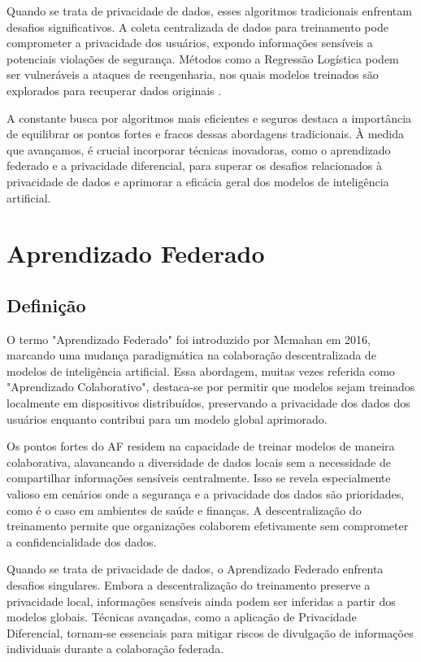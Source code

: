 Quando se trata de privacidade de dados, esses algoritmos tradicionais enfrentam desafios significativos. A coleta centralizada de dados para treinamento pode comprometer a privacidade dos usuários, expondo informações sensíveis a potenciais violações de segurança. Métodos como a Regressão Logística podem ser vulneráveis a ataques de reengenharia, nos quais modelos treinados são explorados para recuperar dados originais \cite{fredrikson2014privacy}.

A constante busca por algoritmos mais eficientes e seguros destaca a importância de equilibrar os pontos fortes e fracos dessas abordagens tradicionais. À medida que avançamos, é crucial incorporar técnicas inovadoras, como o aprendizado federado e a privacidade diferencial, para superar os desafios relacionados à privacidade de dados e aprimorar a eficácia geral dos modelos de inteligência artificial.

\section{Aprendizado Federado}
\label{sec:federado}

\subsection{Definição}

O termo "Aprendizado Federado" foi introduzido por Mcmahan em 2016, marcando uma mudança paradigmática na colaboração descentralizada de modelos de inteligência artificial\cite{mcmahan2017communication}. Essa abordagem, muitas vezes referida como "Aprendizado Colaborativo", destaca-se por permitir que modelos sejam treinados localmente em dispositivos distribuídos, preservando a privacidade dos dados dos usuários enquanto contribui para um modelo global aprimorado.

Os pontos fortes do AF residem na capacidade de treinar modelos de maneira colaborativa, alavancando a diversidade de dados locais sem a necessidade de compartilhar informações sensíveis centralmente. Isso se revela especialmente valioso em cenários onde a segurança e a privacidade dos dados são prioridades, como é o caso em ambientes de saúde e finanças. A descentralização do treinamento permite que organizações colaborem efetivamente sem comprometer a confidencialidade dos dados\cite{yang2019federated}.

Quando se trata de privacidade de dados, o Aprendizado Federado enfrenta desafios singulares. Embora a descentralização do treinamento preserve a privacidade local, informações sensíveis ainda podem ser inferidas a partir dos modelos globais. Técnicas avançadas, como a aplicação de Privacidade Diferencial, tornam-se essenciais para mitigar riscos de divulgação de informações individuais durante a colaboração federada\cite{geyer2017differentially}.

